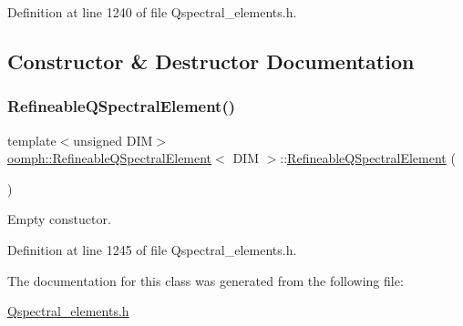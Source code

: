 Definition at line 1240 of file Qspectral\+\_\+elements.\+h.



\subsection{Constructor \& Destructor Documentation}
\mbox{\label{classoomph_1_1RefineableQSpectralElement_a3aadaaf14de4547a54d04539bf0d1f76}} 
\subsubsection{\texorpdfstring{Refineable\+Q\+Spectral\+Element()}{RefineableQSpectralElement()}}
{\footnotesize\ttfamily template$<$unsigned D\+IM$>$ \\
\hyperlink{classoomph_1_1RefineableQSpectralElement}{oomph\+::\+Refineable\+Q\+Spectral\+Element}$<$ D\+IM $>$\+::\hyperlink{classoomph_1_1RefineableQSpectralElement}{Refineable\+Q\+Spectral\+Element} (\begin{DoxyParamCaption}{ }\end{DoxyParamCaption})\hspace{0.3cm}{\ttfamily [inline]}}



Empty constuctor. 



Definition at line 1245 of file Qspectral\+\_\+elements.\+h.



The documentation for this class was generated from the following file\+:\begin{DoxyCompactItemize}
\item 
\hyperlink{Qspectral__elements_8h}{Qspectral\+\_\+elements.\+h}\end{DoxyCompactItemize}
